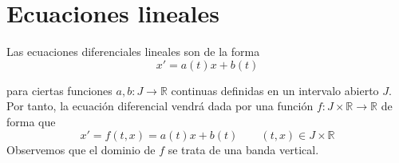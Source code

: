 %
%
%

\section{Ecuaciones lineales}
Las ecuaciones diferenciales lineales son de la forma
\begin{equation*}
    x' = a(t)x + b(t)
\end{equation*}

para ciertas funciones $a,b:J\rightarrow\mathbb{R}$ continuas definidas en un intervalo abierto $J$.\\

\noindent
Por tanto, la ecuación diferencial vendrá dada por una función $f:J\times \mathbb{R}\rightarrow\mathbb{R}$ de forma que
\begin{equation*}
    x' = f(t,x) = a(t)x + b(t) \qquad (t,x)\in J\times \mathbb{R}
\end{equation*}
Observemos que el dominio de $f$ se trata de una banda vertical.\\

